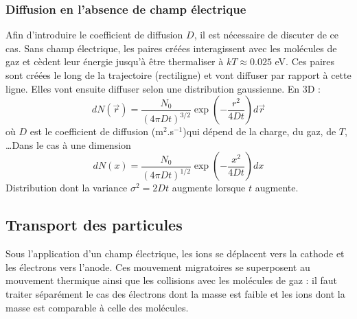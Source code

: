 		\subsubsection{Diffusion en l'absence de champ électrique}
		Afin d'introduire le coefficient de diffusion $D$, il est nécessaire de discuter de ce cas.
		Sans champ électrique, les paires créées interagissent avec les molécules de gaz et cèdent
		leur énergie jusqu'à être thermaliser à $kT\approx0.025$ eV. Ces paires sont créées le 
		long de la trajectoire (rectiligne) et vont diffuser par rapport à cette ligne. Elles vont
		ensuite diffuser selon une distribution gaussienne. En 3D :
		\begin{equation}
		dN(\overrightarrow{r})=\frac{N_0}{(4\pi Dt)^{3/2}}\exp{\left(-\frac{r^2}{4Dt}\right)}
		d\overrightarrow{r}
		\end{equation}
		où $D$ est le coefficient de diffusion (m$^2$.s$^{-1}$)qui dépend de la charge, du gaz, 
		de $T$, \dots Dans le cas à une dimension
		\begin{equation}
		dN(x)=\frac{N_0}{(4\pi Dt)^{1/2}}\exp{\left(-\frac{x^2}{4Dt}\right)}dx
		\end{equation}
		Distribution dont la variance $\sigma^2=2Dt$ augmente lorsque $t$ augmente.
		
	\subsection{Transport des particules}%
	Sous l'application d'un champ électrique, les ions se déplacent vers la cathode et les électrons
	vers l'anode. Ces mouvement migratoires se superposent au mouvement thermique ainsi que les 
	collisions avec les molécules de gaz : il faut traiter séparément le cas des électrons dont la
	 masse est faible et les ions dont la masse est comparable à celle des molécules.
	 
